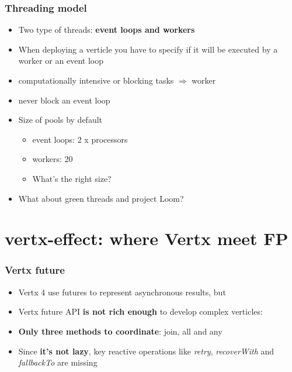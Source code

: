 \documentclass{beamer}
\begin{document}
\begin{frame}
\frametitle{Threading model}
\begin{itemize}
\item<1->Two type of threads: \textbf{event loops and workers}
\item<2-> When deploying a verticle you have to specify if it will be executed by      
 a worker or an event loop
\item<3-> computationally intensive or blocking tasks $\Rightarrow$ worker
 \item<4-> never block an event loop
 \item<5-> Size of pools by default
 \begin{itemize}
          \item<6->event loops: 2 x processors
          \item<7->workers: 20
          \item<8->What's the right size?
 \end{itemize}     
 \item<9-> What about green threads and project Loom?    
\end{itemize}
\end{frame}


\section{vertx-effect: where Vertx meet FP }
\begin{frame}
\frametitle{Vertx future}
 \begin{itemize}
          \item<1->Vertx 4 use futures to represent asynchronous results, but
          \item<2-> Vertx future API \textbf{is not rich enough} to develop complex verticles:
\item<3->\textbf{Only three methods to coordinate}: join, all and any
\item<4-> Since \textbf{it's not lazy}, key reactive operations like \textit{retry}, \textit{recoverWith} and \textit{fallbackTo} are missing                       

 \end{itemize}   
\end{frame}
\end{document}
